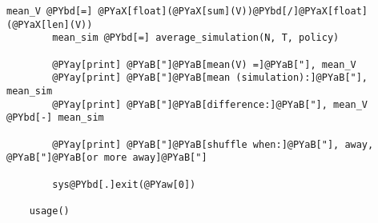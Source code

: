 \begin{Verbatim}[commandchars=@\[\]]
        mean_V @PYbd[=] @PYaX[float](@PYaX[sum](V))@PYbd[/]@PYaX[float](@PYaX[len](V))
        mean_sim @PYbd[=] average_simulation(N, T, policy)

        @PYay[print] @PYaB["]@PYaB[mean(V) =]@PYaB["], mean_V
        @PYay[print] @PYaB["]@PYaB[mean (simulation):]@PYaB["], mean_sim
        @PYay[print] @PYaB["]@PYaB[difference:]@PYaB["], mean_V @PYbd[-] mean_sim

        @PYay[print] @PYaB["]@PYaB[shuffle when:]@PYaB["], away, @PYaB["]@PYaB[or more away]@PYaB["]

        sys@PYbd[.]exit(@PYaw[0])

    usage()
\end{Verbatim}
